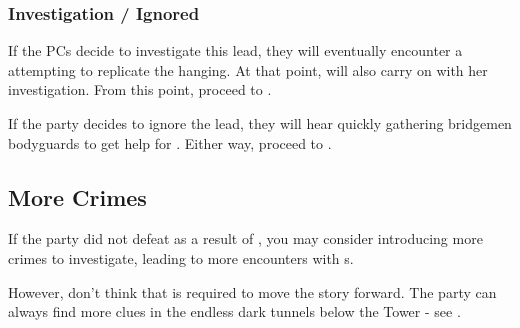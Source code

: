 \subsubsection{Investigation / Ignored}

If the PCs decide to investigate this lead, they will eventually encounter a \enemyMidnightAssassin{} attempting to replicate the hanging. At that point, \npcShallan{} will also carry on with her investigation. From this point, proceed to .

If the party decides to ignore the lead, they will hear \npcAdolin{} quickly gathering bridgemen bodyguards to get help for \npcShallan{}. Either way, proceed to .





\subsection{More Crimes}

If the party did not defeat \npcMidnightMotherFull{} as a result of , you may consider introducing more crimes to investigate, leading to more encounters with \enemyMidnightAssassin{}s. 

However, don't think that is required to move the story forward. The party can always find more clues in the endless dark tunnels below the Tower - see .
